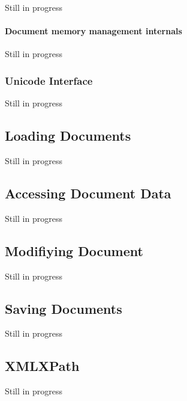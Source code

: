 Still in progress \hypertarget{XMLManual_XMLMemoryInternals}{}\paragraph{Document memory management internals}\label{XMLManual_XMLMemoryInternals}
Still in progress \hypertarget{XMLManual_XMLUnicode}{}\subsubsection{Unicode Interface}\label{XMLManual_XMLUnicode}
Still in progress \hypertarget{XMLManual_XMLLoading}{}\subsection{Loading Documents}\label{XMLManual_XMLLoading}
Still in progress \hypertarget{XMLManual_XMLAccessing}{}\subsection{Accessing Document Data}\label{XMLManual_XMLAccessing}
Still in progress \hypertarget{XMLManual_XMLModifying}{}\subsection{Modifiying Document}\label{XMLManual_XMLModifying}
Still in progress \hypertarget{XMLManual_XMLSaving}{}\subsection{Saving Documents}\label{XMLManual_XMLSaving}
Still in progress \hypertarget{XMLManual_XMLXPath}{}\subsection{XMLXPath}\label{XMLManual_XMLXPath}
Still in progress 